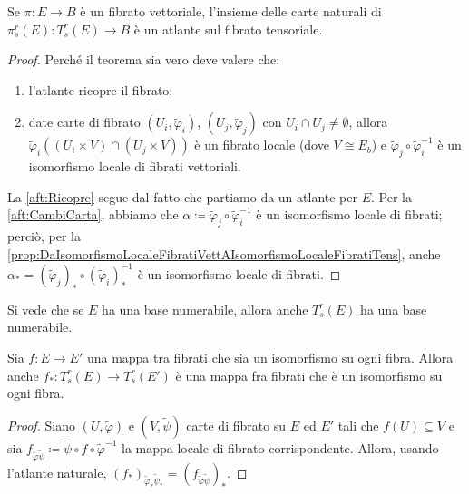 
\begin{theorem} \label{thm:AtlanteFibratoTensoriale}
	Se $\pi: E \to B$ è un fibrato vettoriale, l'insieme delle carte naturali di $\pi_s^r(E):T_s^r(E) \to B$ è un atlante sul fibrato tensoriale.
\end{theorem}
\begin{proof}
	Perché il teorema sia vero deve valere che:
	\begin{enumerate}
		\item l'atlante ricopre il fibrato; \label{aft:Ricopre}
		\item date carte di fibrato $(U_i,\tilde\varphi_i)$, $(U_j,\tilde\varphi_j)$ con $U_i\cap U_j\not=\emptyset$, allora $\tilde\varphi_i( (U_i\times V) \cap (U_j\times V) )$ è un fibrato locale (dove $V\cong E_b$) e $\tilde\varphi_j\circ \tilde\varphi_i^{-1}$ è un isomorfismo locale di fibrati vettoriali. \label{aft:CambiCarta}
	\end{enumerate}
	La \ref{aft:Ricopre} segue dal fatto che partiamo da un atlante per $E$.
	Per la \ref{aft:CambiCarta}, abbiamo che $\alpha \coloneqq \tilde\varphi_j\circ \tilde\varphi_i^{-1}$ è un isomorfismo locale di fibrati; perciò, per la \cref{prop:DaIsomorfismoLocaleFibratiVettAIsomorfismoLocaleFibratiTens}, anche $\alpha_* = (\tilde\varphi_j)_*\circ (\tilde\varphi_i)_*^{-1}$ è un isomorfismo locale di fibrati.
\end{proof}

\begin{remark}
	Si vede che se $E$ ha una base numerabile, allora anche $T_s^r(E)$ ha una base numerabile. 
\end{remark}

\begin{proposition} 
	Sia $f:E\to E'$ una mappa tra fibrati che sia un isomorfismo su ogni fibra. Allora anche $f_*:T_s^r(E) \to T_s^r(E')$ è una mappa fra fibrati che è un isomorfismo su ogni fibra.
\end{proposition}
\begin{proof}
	Siano $(U,\tilde\varphi)$ e $(V,\tilde\psi)$ carte di fibrato su $E$ ed $E'$ tali che $f(U) \subseteq V$ e sia $f_{\tilde\varphi\tilde\psi} \coloneqq \tilde\psi \circ f \circ \tilde\varphi^{-1}$ la mappa locale di fibrato corrispondente. Allora, usando l'atlante naturale, $(f_*)_{\tilde\varphi_*\tilde\psi_*} = (f_{\tilde\varphi\tilde\psi})_*$.
\end{proof}

